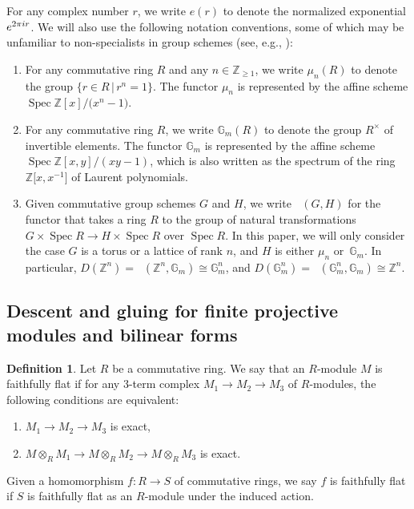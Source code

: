 \documentclass[11pt]{article}
\newcommand{\bG}{\mathbb{G}}
\newcommand{\bZ}{\mathbb{Z}}
\DeclareMathOperator{\uHom}{\underline{Hom}}
\DeclareMathOperator{\Spec}{Spec}
\theoremstyle{definition}
\newtheorem{defn}[thm]{Definition}
\begin{document}
For any complex number $r$, we write $e(r)$ to denote the normalized exponential ${\rm e}^{2\pi {\rm i} r}$. We will also use the following notation conventions, some of which may be unfamiliar to non-specialists in group schemes (see, e.g., \cite{SGA3}):
\begin{enumerate}\itemsep=0pt
\item For any commutative ring $R$ and any $n \in \bZ_{\geq 1}$, we write $\mu_n(R)$ to denote the group $\{ r \in R \,|\, r^n = 1\}$. The functor $\mu_n$ is represented by the affine scheme $\Spec \bZ[x]/\big(x^n-1\big)$.
\item For any commutative ring $R$, we write $\bG_m(R)$ to denote the group $R^\times$ of invertible elements. The functor $\bG_m$ is represented by the affine scheme $\Spec \bZ[x,y]/(xy-1)$, which is also written as the spectrum of the ring $\bZ\big[x,x^{-1}\big]$ of Laurent polynomials.
\item Given commutative group schemes $G$ and $H$, we write $\uHom(G,H)$ for the functor that takes a ring $R$ to the group of natural transformations $G \times \Spec R \to H \times \Spec R$ over $\Spec R$. In this paper, we will only consider the case $G$ is a torus or a lattice of rank $n$, and $H$ is either $\mu_n$ or~$\bG_m$. In particular, $D(\bZ^n) = \uHom(\bZ^n,\bG_m) \cong \bG_m^n$, and $D(\bG_m^n) = \uHom(\bG_m^n, \bG_m) \cong \bZ^n$.
\end{enumerate}

\subsection{Descent and gluing for finite projective modules and bilinear forms}

\begin{defn}
Let $R$ be a commutative ring. We say that an $R$-module $M$ is faithfully flat if for any 3-term complex $M_1 \to M_2 \to M_3$ of $R$-modules, the following conditions are equivalent:
\begin{enumerate}\itemsep=0pt
\item[1)] $M_1 \to M_2 \to M_3$ is exact,
\item[2)] $M \otimes_{R} M_1 \to M \otimes_{R} M_2 \to M \otimes_{R} M_3$ is exact.
\end{enumerate}
Given a homomorphism $f\colon R \to S$ of commutative rings, we say $f$ is faithfully flat if $S$ is faithfully flat as an $R$-module under the induced action.
\end{defn}
\end{document}
